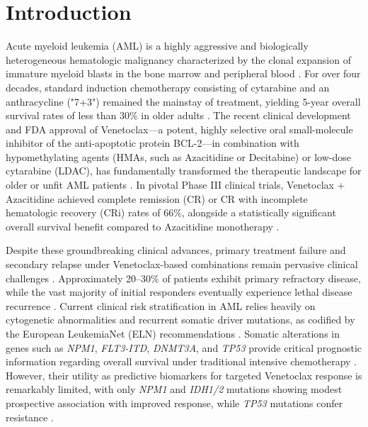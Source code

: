 \documentclass[11pt,a4paper]{article}
\begin{document}
\newpage

\section{Introduction}
Acute myeloid leukemia (AML) is a highly aggressive and biologically heterogeneous hematologic malignancy characterized by the clonal expansion of immature myeloid blasts in the bone marrow and peripheral blood \cite{dohner2015aml}. For over four decades, standard induction chemotherapy consisting of cytarabine and an anthracycline ("7+3") remained the mainstay of treatment, yielding 5-year overall survival rates of less than 30\% in older adults \cite{dohner2017eln,dohner2022eln}. The recent clinical development and FDA approval of Venetoclax—a potent, highly selective oral small-molecule inhibitor of the anti-apoptotic protein BCL-2—in combination with hypomethylating agents (HMAs, such as Azacitidine or Decitabine) or low-dose cytarabine (LDAC), has fundamentally transformed the therapeutic landscape for older or unfit AML patients \cite{dinardo2020venetoclax,pollyea2020venetoclax,wei2020venetoclax,dinardo2020nejm}. In pivotal Phase III clinical trials, Venetoclax + Azacitidine achieved complete remission (CR) or CR with incomplete hematologic recovery (CRi) rates of 66\%, alongside a statistically significant overall survival benefit compared to Azacitidine monotherapy \cite{dinardo2020nejm}.

Despite these groundbreaking clinical advances, primary treatment failure and secondary relapse under Venetoclax-based combinations remain pervasive clinical challenges \cite{morsia2020npm1,stahl2021venetoclax}. Approximately 20--30\% of patients exhibit primary refractory disease, while the vast majority of initial responders eventually experience lethal disease recurrence \cite{dinardo2020venetoclax}. Current clinical risk stratification in AML relies heavily on cytogenetic abnormalities and recurrent somatic driver mutations, as codified by the European LeukemiaNet (ELN) recommendations \cite{dohner2017eln,dohner2022eln,papaemmanuil2016genomic}. Somatic alterations in genes such as \textit{NPM1}, \textit{FLT3-ITD}, \textit{DNMT3A}, and \textit{TP53} provide critical prognostic information regarding overall survival under traditional intensive chemotherapy \cite{cancer2013tcga}. However, their utility as predictive biomarkers for targeted Venetoclax response is remarkably limited, with only \textit{NPM1} and \textit{IDH1/2} mutations showing modest prospective association with improved response, while \textit{TP53} mutations confer resistance \cite{morsia2020npm1,stahl2021venetoclax}.
\end{document}
